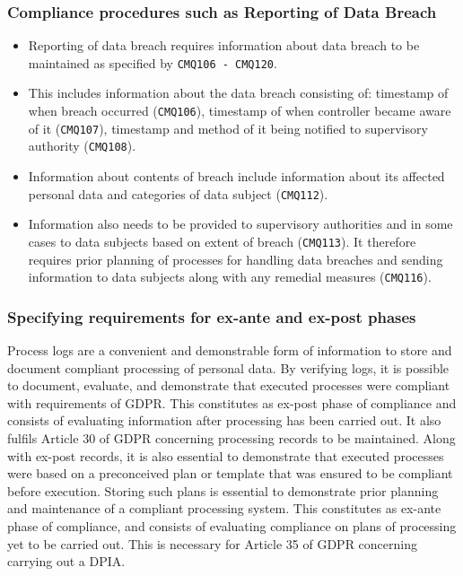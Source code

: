 \subsubsection{Compliance procedures such as Reporting of Data Breach}
\begin{itemize}
    \item Reporting of data breach requires information about data breach to be maintained as specified by \texttt{CMQ106 - CMQ120}.
    \item This includes information about the data breach consisting of: timestamp of when breach occurred (\texttt{CMQ106}), timestamp of when controller became aware of it (\texttt{CMQ107}), timestamp and method of it being notified to supervisory authority (\texttt{CMQ108}).
    \item Information about contents of breach include information about its affected personal data and categories of data subject (\texttt{CMQ112}).
    \item Information also needs to be provided to supervisory authorities and in some cases to data subjects based on extent of breach (\texttt{CMQ113}). It therefore requires prior planning of processes for handling data breaches and sending information to data subjects along with any remedial measures (\texttt{CMQ116}).
\end{itemize}

\subsubsection{Specifying requirements for ex-ante and ex-post phases}
Process logs are a convenient and demonstrable form of information to store and document compliant processing of personal data. By verifying logs, it is possible to document, evaluate, and demonstrate that executed processes were compliant with requirements of GDPR. This constitutes as ex-post phase of compliance and consists of evaluating information after processing has been carried out. It also fulfils Article 30 of GDPR concerning processing records to be maintained. Along with ex-post records, it is also essential to demonstrate that executed processes were based on a preconceived plan or template that was ensured to be compliant before execution. Storing such plans is essential to demonstrate prior planning and maintenance of a compliant processing system. This constitutes as ex-ante phase of compliance, and consists of evaluating compliance on plans of processing yet to be carried out. This is necessary for Article 35 of GDPR concerning carrying out a DPIA.

